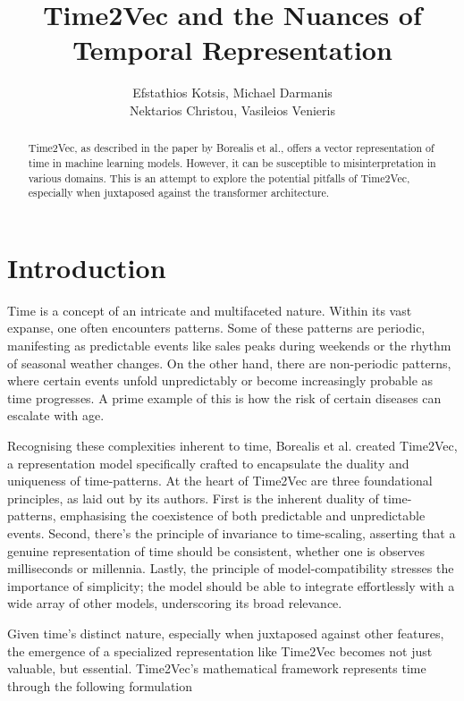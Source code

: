 \documentclass{tufte-handout}
\title{Time2Vec and the Nuances of Temporal Representation}
\author{Efstathios Kotsis, Michael Darmanis\\ Nektarios Christou, Vasileios Venieris
}
\begin{document}
\maketitle%
\vspace{12pt}

\begin{abstract}
Time2Vec, as described in the paper by Borealis et al.\cite{time2vec}, offers a vector representation of time in machine learning models. However, it can be susceptible to misinterpretation in various domains. This is an attempt to explore the potential pitfalls of Time2Vec, especially when juxtaposed against the transformer architecture.
\end{abstract}

\section{Introduction}

Time is a concept of an intricate and multifaceted nature. Within its vast expanse, one often encounters patterns. Some of these patterns are periodic, manifesting as predictable events like sales peaks during weekends or the rhythm of seasonal weather changes. On the other hand, there are non-periodic patterns, where certain events unfold unpredictably or become increasingly probable as time progresses. A prime example of this is how the risk of certain diseases can escalate with age.

Recognising these complexities inherent to time, Borealis et al.\cite{time2vec} created Time2Vec, a representation model specifically crafted to encapsulate the duality and uniqueness of time-patterns. At the heart of Time2Vec are three foundational principles, as laid out by its authors. First is the inherent duality of time-patterns, emphasising the coexistence of both predictable and unpredictable events. Second, there's the principle of invariance to time-scaling, asserting that a genuine representation of time should be consistent, whether one is observes milliseconds or millennia. Lastly, the principle of model-compatibility stresses the importance of simplicity; the model should be able to integrate effortlessly with a wide array of other models, underscoring its broad relevance.

Given time's distinct nature, especially when juxtaposed against other features, the emergence of a specialized representation like Time2Vec becomes not just valuable, but essential. Time2Vec's mathematical framework represents time through the following formulation
\end{document}
